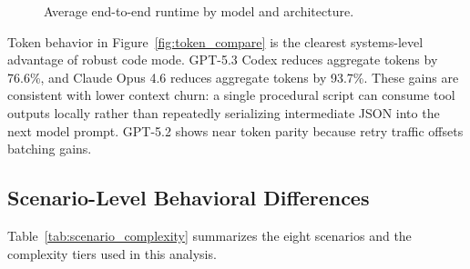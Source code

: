 \documentclass[journal,article,submit,pdftex,moreauthors]{Definitions/mdpi}
\begin{document}
\begin{figure}[H]
\centering
{}
\caption{Average end-to-end runtime by model and architecture.\label{fig:latency_compare}}
\end{figure}

Token behavior in Figure~\ref{fig:token_compare} is the clearest systems-level advantage of robust code mode. GPT-5.3 Codex reduces aggregate tokens by 76.6\%, and Claude Opus 4.6 reduces aggregate tokens by 93.7\%. These gains are consistent with lower context churn: a single procedural script can consume tool outputs locally rather than repeatedly serializing intermediate JSON into the next model prompt. GPT-5.2 shows near token parity because retry traffic offsets batching gains.

\subsection{Scenario-Level Behavioral Differences}

Table~\ref{tab:scenario_complexity} summarizes the eight scenarios and the complexity tiers used in this analysis.
\end{document}
